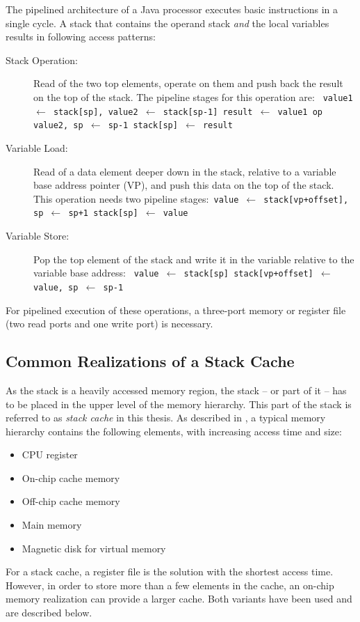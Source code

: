 The pipelined architecture of a Java processor executes basic
instructions in a single cycle. A stack that contains the operand
stack \emph{and} the local variables results in following access
patterns:
%
\begin{description}
\item[Stack Operation:] Read of the two top elements, operate on them and
push back the result on the top of the stack. The pipeline stages
for this operation are:\newline
\texttt{
    value1 $\leftarrow $ stack[sp], value2 $\leftarrow $ stack[sp-1]\newline
    result $\leftarrow $ value1 op value2, sp $\leftarrow $ sp-1\newline
    stack[sp] $\leftarrow $ result
}

\item[Variable Load:] Read of a data element deeper down in the stack,
relative to a variable base address pointer (VP), and push this data
on the top of the stack. This operation needs two pipeline
stages:\newline \texttt{
    value $\leftarrow $ stack[vp+offset], sp $\leftarrow $ sp+1\newline
    stack[sp] $\leftarrow $ value
}

\item[Variable Store:] Pop the top element of the stack and write it in
the variable relative to the variable base address:\newline
\texttt{
    value $\leftarrow $ stack[sp]\newline
    stack[vp+offset] $\leftarrow $ value, sp $\leftarrow $ sp-1
}
\end{description}
%
For pipelined execution of these operations, a three-port memory or
register file (two read ports and one write port) is necessary.

\subsection{Common Realizations of a Stack Cache}

As the stack is a heavily accessed memory region, the stack -- or
part of it -- has to be placed in the upper level of the memory
hierarchy. This part of the stack is referred to as \emph{stack
cache} in this thesis. As described in \cite{Hennessy02}, a typical
memory hierarchy contains the following elements, with increasing
access time and size:
%
\begin{itemize}
\item CPU register
\item On-chip cache memory
\item Off-chip cache memory
\item Main memory
\item Magnetic disk for virtual memory
\end{itemize}
%
For a stack cache, a register file is the solution with the shortest access
time. However, in order to store more than a few elements in the cache, an
on-chip memory realization can provide a larger cache. Both variants have
been used and are described below.

